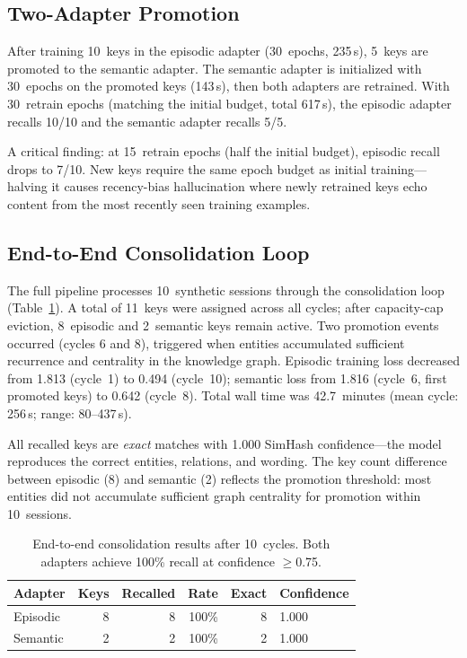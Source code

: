 \documentclass[11pt]{article}
\begin{document}
\subsection{Two-Adapter Promotion}
\label{sec:exp-promotion}

After training 10~keys in the episodic adapter (30~epochs, 235\,s), 5~keys are promoted to the semantic adapter.
The semantic adapter is initialized with 30~epochs on the promoted keys (143\,s), then both adapters are retrained.
With 30~retrain epochs (matching the initial budget, total 617\,s), the episodic adapter recalls 10/10 and the semantic adapter recalls 5/5.

A critical finding: at 15~retrain epochs (half the initial budget), episodic recall drops to 7/10.
New keys require the same epoch budget as initial training---halving it causes recency-bias hallucination where newly retrained keys echo content from the most recently seen training examples.

\subsection{End-to-End Consolidation Loop}
\label{sec:exp-e2e}

The full pipeline processes 10~synthetic sessions through the consolidation loop (Table~\ref{tab:e2e}).
A total of 11~keys were assigned across all cycles; after capacity-cap eviction, 8~episodic and 2~semantic keys remain active.
Two promotion events occurred (cycles 6 and 8), triggered when entities accumulated sufficient recurrence and centrality in the knowledge graph.
Episodic training loss decreased from 1.813 (cycle~1) to 0.494 (cycle~10); semantic loss from 1.816 (cycle~6, first promoted keys) to 0.642 (cycle~8).
Total wall time was 42.7~minutes (mean cycle: 256\,s; range: 80--437\,s).

All recalled keys are \emph{exact} matches with 1.000 SimHash confidence---the model reproduces the correct entities, relations, and wording.
The key count difference between episodic (8) and semantic (2) reflects the promotion threshold: most entities did not accumulate sufficient graph centrality for promotion within 10~sessions.

\begin{table}[t]
\centering
\caption{End-to-end consolidation results after 10~cycles. Both adapters achieve 100\% recall at confidence $\geq$0.75.}
\label{tab:e2e}
\small
\begin{tabular}{@{}lrrrrl@{}}
\toprule
\textbf{Adapter} & \textbf{Keys} & \textbf{Recalled} & \textbf{Rate} & \textbf{Exact} & \textbf{Confidence} \\
\midrule
Episodic & 8 & 8 & 100\% & 8 & 1.000 \\
Semantic & 2 & 2 & 100\% & 2 & 1.000 \\
\bottomrule
\end{tabular}
\end{table}
\end{document}

